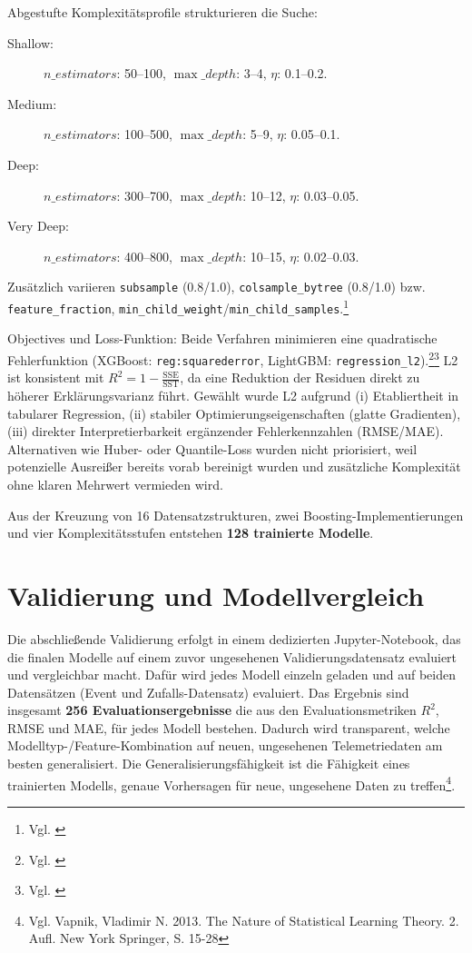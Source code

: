 Abgestufte Komplexitätsprofile strukturieren die Suche:
\begin{description}
  \item[Shallow:] $n\_estimators$: 50–100, $\max\_depth$: 3–4, $\eta$: 0.1–0.2.
  \item[Medium:] $n\_estimators$: 100–500, $\max\_depth$: 5–9, $\eta$: 0.05–0.1.
  \item[Deep:] $n\_estimators$: 300–700, $\max\_depth$: 10–12, $\eta$: 0.03–0.05.
  \item[Very Deep:] $n\_estimators$: 400–800, $\max\_depth$: 10–15, $\eta$: 0.02–0.03.
\end{description}
Zusätzlich variieren \texttt{subsample} (0.8/1.0), \texttt{colsample\_bytree} (0.8/1.0) bzw. \texttt{feature\_fraction}, \texttt{min\_child\_weight}/\texttt{min\_child\_samples}.\footnote{Vgl. \cite{Ke2017LightGBM}}

Objectives und Loss-Funktion: Beide Verfahren minimieren eine quadratische Fehlerfunktion (XGBoost: \texttt{reg:squarederror}, LightGBM: \texttt{regression\_l2}).\footnote{Vgl. \cite{Chen2016XGBoost}}\footnote{Vgl. \cite{Ke2017LightGBM}} L2 ist konsistent mit $R^2 = 1 - \tfrac{\text{SSE}}{\text{SST}}$, da eine Reduktion der Residuen direkt zu höherer Erklärungsvarianz führt. Gewählt wurde L2 aufgrund (i) Etabliertheit in tabularer Regression, (ii) stabiler Optimierungseigenschaften (glatte Gradienten), (iii) direkter Interpretierbarkeit ergänzender Fehlerkennzahlen (RMSE/MAE). Alternativen wie Huber- oder Quantile-Loss wurden nicht priorisiert, weil potenzielle Ausreißer bereits vorab bereinigt wurden und zusätzliche Komplexität ohne klaren Mehrwert vermieden wird.

Aus der Kreuzung von 16 Datensatzstrukturen, zwei Boosting-Implementierungen und vier Komplexitätsstufen entstehen \textbf{128 trainierte Modelle}.







\section{Validierung und Modellvergleich}
\label{sec:validierung_modellvergleich}

Die abschließende Validierung erfolgt in einem dedizierten Jupyter-Notebook, das die finalen Modelle auf einem zuvor ungesehenen Validierungsdatensatz evaluiert und vergleichbar macht.
Dafür wird jedes Modell einzeln geladen und auf beiden Datensätzen (Event und Zufalls-Datensatz) evaluiert. Das Ergebnis sind insgesamt \textbf{256 Evaluationsergebnisse} die aus den Evaluationsmetriken $R^2$, RMSE und MAE, für jedes Modell bestehen.
\noindent
Dadurch wird transparent, welche Modelltyp-/Feature-Kombination auf neuen, ungesehenen Telemetriedaten am besten generalisiert. Die Generalisierungsfähigkeit ist die Fähigkeit eines trainierten Modells, genaue Vorhersagen für neue, ungesehene Daten zu treffen\footnote{Vgl. Vapnik, Vladimir N. 2013. The Nature of Statistical Learning Theory. 2. Aufl. New York Springer, S. 15-28}.
